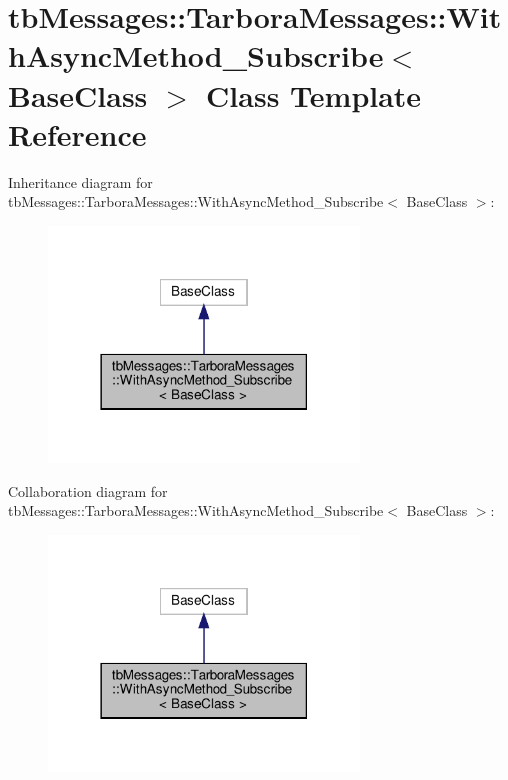 \hypertarget{classtbMessages_1_1TarboraMessages_1_1WithAsyncMethod__Subscribe}{}\section{tb\+Messages\+:\+:Tarbora\+Messages\+:\+:With\+Async\+Method\+\_\+\+Subscribe$<$ Base\+Class $>$ Class Template Reference}
\label{classtbMessages_1_1TarboraMessages_1_1WithAsyncMethod__Subscribe}


Inheritance diagram for tb\+Messages\+:\+:Tarbora\+Messages\+:\+:With\+Async\+Method\+\_\+\+Subscribe$<$ Base\+Class $>$\+:
\nopagebreak
\begin{figure}[H]
\begin{center}
\leavevmode
\includegraphics[width=234pt]{classtbMessages_1_1TarboraMessages_1_1WithAsyncMethod__Subscribe__inherit__graph}
\end{center}
\end{figure}


Collaboration diagram for tb\+Messages\+:\+:Tarbora\+Messages\+:\+:With\+Async\+Method\+\_\+\+Subscribe$<$ Base\+Class $>$\+:
\nopagebreak
\begin{figure}[H]
\begin{center}
\leavevmode
\includegraphics[width=234pt]{classtbMessages_1_1TarboraMessages_1_1WithAsyncMethod__Subscribe__coll__graph}
\end{center}
\end{figure}
